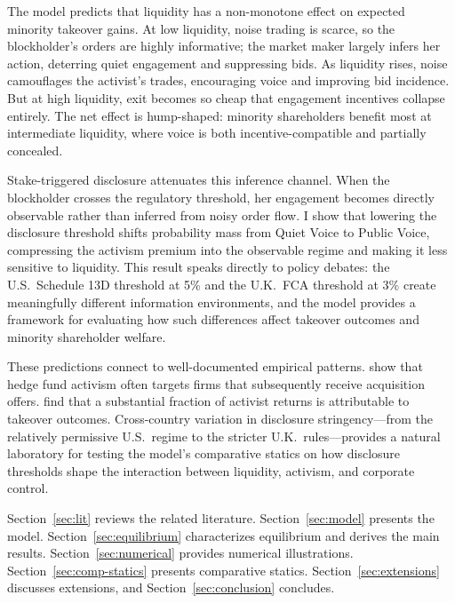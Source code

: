 The model predicts that liquidity has a non-monotone effect on expected minority takeover gains. At low liquidity, noise trading is scarce, so the blockholder's orders are highly informative; the market maker largely infers her action, deterring quiet engagement and suppressing bids. As liquidity rises, noise camouflages the activist's trades, encouraging voice and improving bid incidence. But at high liquidity, exit becomes so cheap that engagement incentives collapse entirely. The net effect is hump-shaped: minority shareholders benefit most at intermediate liquidity, where voice is both incentive-compatible and partially concealed.

Stake-triggered disclosure attenuates this inference channel. When the blockholder crosses the regulatory threshold, her engagement becomes directly observable rather than inferred from noisy order flow. I show that lowering the disclosure threshold shifts probability mass from Quiet Voice to Public Voice, compressing the activism premium into the observable regime and making it less sensitive to liquidity. This result speaks directly to policy debates: the U.S.\ Schedule 13D threshold at 5\% and the U.K.\ FCA threshold at 3\% create meaningfully different information environments, and the model provides a framework for evaluating how such differences affect takeover outcomes and minority shareholder welfare.

These predictions connect to well-documented empirical patterns. \citet{BravJiangPartnoyThomas2008} show that hedge fund activism often targets firms that subsequently receive acquisition offers. \citet{GreenwoodSchor2009} find that a substantial fraction of activist returns is attributable to takeover outcomes. Cross-country variation in disclosure stringency---from the relatively permissive U.S.\ regime to the stricter U.K.\ rules---provides a natural laboratory for testing the model's comparative statics on how disclosure thresholds shape the interaction between liquidity, activism, and corporate control.

Section~\ref{sec:lit} reviews the related literature. Section~\ref{sec:model} presents the model. Section~\ref{sec:equilibrium} characterizes equilibrium and derives the main results. Section~\ref{sec:numerical} provides numerical illustrations. Section~\ref{sec:comp-statics} presents comparative statics. Section~\ref{sec:extensions} discusses extensions, and Section~\ref{sec:conclusion} concludes.
